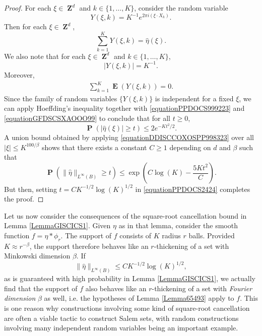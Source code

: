 \documentclass[dvipsnames,letterpaper,12pt]{article}
\numberwithin{equation}{section}
\DeclareMathOperator{\ZZ}{\mathbf{Z}}
\numberwithin{theorem}{section}
\DeclareMathOperator{\EE}{\mathbf{E}}
\DeclareMathOperator{\PP}{\mathbf{P}}
\begin{document}
\begin{proof}
    For each $\xi \in \ZZ^d$ and $k \in \{ 1, \dots, K \}$, consider the random variable
    \[ Y(\xi,k) = K^{-1} e^{2 \pi i (\xi \cdot X_k)}. \]    
    Then for each $\xi \in \ZZ^d$,
    \begin{equation} \label{equationPPDOCS999223}
        \sum_{k = 1}^K Y(\xi,k) = \widehat{\eta}(\xi).
    \end{equation}
    We also note that for each $\xi \in \ZZ^d$ and $k \in \{ 1, \dots, K \}$,
    \begin{equation} \label{equationGFDSCSXAOOO99}
        |Y(\xi,k)| = K^{-1}.
    \end{equation}
    Moreover,
    \begin{equation} \label{equationDOIJWIJCCCCC5555322}
    \begin{split}
        \sum_{k = 1}^K \EE(Y(\xi,k)) = 0.
    \end{split}
    \end{equation}
    Since the family of random variables $\{ Y(\xi,k) \}$ is independent for a fixed $\xi$, we can apply Hoeffding's inequality together with \eqref{equationPPDOCS999223} and \eqref{equationGFDSCSXAOOO99} to conclude that for all $t \geq 0$,
    \begin{equation} \label{equationDDISCCOXOSPP998323}
        \PP \left( |\widehat{\eta}(\xi)| \geq t \right) \leq 2 e^{-Kt^2/2}.
    \end{equation}
    A union bound obtained by applying \eqref{equationDDISCCOXOSPP998323} over all $|\xi| \leq K^{100/\beta}$ shows that there exists a constant $C \geq 1$ depending on $d$ and $\beta$ such that %
    \begin{equation} \label{equationPPDOCS2424}
        \PP \left( \| \widehat{\eta} \|_{L^\infty(B)} \geq t \right) \leq \exp \left( C \log(K) - \frac{5K t^2}{C} \right).
    \end{equation}
    But then, setting $t = CK^{-1/2} \log(K)^{1/2}$ in \eqref{equationPPDOCS2424} completes the proof.
\end{proof}

Let us now consider the consequences of the square-root cancellation bound in Lemma \ref{LemmaGISCICS1}. Given $\eta$ as in that lemma, consider the smooth function $f = \eta * \phi_r$. The support of $f$ consists of $K$ radius $r$ balls. Provided $K \approx r^{-\beta}$, the support therefore behaves like an $r$-thickening of a set with Minkowski dimension $\beta$. If
%
\begin{equation}
    \| \widehat{\eta} \|_{L^\infty(B)} \leq C K^{-1/2} \log(K)^{1/2},
\end{equation}
%
as is guaranteed with high probability in Lemma \ref{LemmaGISCICS1}, we actually find that the support of $f$ also behaves like an $r$-thickening of a set with \emph{Fourier dimension} $\beta$ as well, i.e. the hypotheses of Lemma \ref{Lemma65493} apply to $f$. This is one reason why constructions involving some kind of square-root cancellation are often a viable tactic to construct Salem sets, with random constructions involving many independent random variables being an important example.
\end{document}
